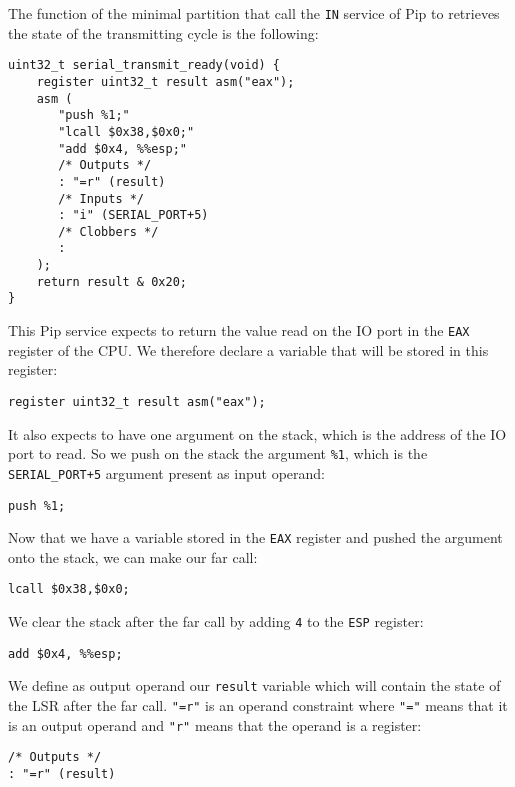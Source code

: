 \documentclass[10pt,a4paper,titlepage]{refart}
\begin{document}
The function of the minimal partition that call the \texttt{IN} service of Pip
to retrieves the state of the transmitting cycle is the following:

\begin{lstlisting}[style=CStyle]
uint32_t serial_transmit_ready(void) {
    register uint32_t result asm("eax");
    asm (
       "push %1;"
       "lcall $0x38,$0x0;"
       "add $0x4, %%esp;"
       /* Outputs */
       : "=r" (result)
       /* Inputs */
       : "i" (SERIAL_PORT+5)
       /* Clobbers */
       :
    );
    return result & 0x20;
}
\end{lstlisting}

This Pip service expects to return the value read on the IO port in the
\texttt{EAX} register of the CPU. We therefore declare a variable that will be
stored in this register:

\begin{lstlisting}[style=CStyle]
register uint32_t result asm("eax");
\end{lstlisting}

It also expects to have one argument on the stack, which is the address of the
IO port to read. So we push on the stack the argument \texttt{\%1}, which is the
\texttt{SERIAL\_PORT+5} argument present as input operand:

\begin{lstlisting}
push %1;
\end{lstlisting}

Now that we have a variable stored in the \texttt{EAX} register and pushed the
argument onto the stack, we can make our far call:

\begin{lstlisting}
lcall $0x38,$0x0;
\end{lstlisting}

We clear the stack after the far call by adding \texttt{4} to the \texttt{ESP}
register:

\begin{lstlisting}
add $0x4, %%esp;
\end{lstlisting}

We define as output operand our \texttt{result} variable which will contain the
state of the LSR after the far call. \texttt{"=r"} is an operand constraint
where \texttt{"="} means that it is an output operand and \texttt{"r"} means that the
operand is a register:

\begin{lstlisting}[style=CStyle]
/* Outputs */
: "=r" (result)
\end{lstlisting}
\end{document}
